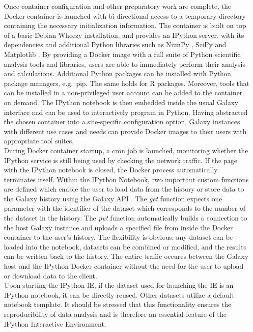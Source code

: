 \documentclass{bioinfo}
\begin{document}
\begin{methods}
Once container configuration and other preparatory work are complete, the Docker container is launched with bi-directional
access to a temporary directory containing the necessary initialization information. The container is built on top of a basic Debian Wheezy installation,
and provides an IPython server, with its dependencies and additional Python libraries such as NumPy \citep{Walt2011}, SciPy \citep{Jones2015} and Matplotlib \citep{Hunter2007}.
By providing a Docker image with a full suite of Python scientific analysis tools and libraries, users are able 
to immediately perform their analysis and calculations. Additional Python packages can be installed with Python
package managers, e.g.\ pip. The same holds for R packages. Moreover, tools that can be installed in a non-privileged user account can be added to the container on demand. 
The IPython notebook is then embedded inside the usual Galaxy interface and can be used to interactively program in Python.
Having abstracted the chosen container into a site-specific configuration option, Galaxy instances with different use cases
and needs can provide Docker images to their users with appropriate tool suites.\\
During Docker container startup, a cron job is launched, monitoring whether the IPython service
is still being used by checking the network traffic. If the page with the IPython notebook is closed, the
Docker process automatically terminates itself. Within the IPython Notebook, 
two important custom functions are defined which enable the
user to load data from the history or store data to the Galaxy history using the Galaxy API \citep{Sloggett2013}.
The \textit{get} function expects one parameter with the identifier of the dataset which corresponds to the number
of the dataset in the history. The \textit{put} function automatically builds a connection to the host
Galaxy instance and uploads a specified file from inside the Docker container to the user's
history. The flexibility is obvious: any dataset can be
loaded into the notebook, datasets can be combined or modified, and the results can be written back to the history.
The entire traffic occures between the Galaxy host and the IPython Docker container without the need for the user to upload or download data to the client. \\
Upon starting the IPython IE, if the dataset used for launching the IE is an IPython
notebook, it can be directly reused. Other datasets utilize a default notebook template. It should be stressed that
this functionality ensures the reproducibility of data analysis and is therefore an essential
feature of the IPython Interactive Environment.



\end{methods}
\end{document}
